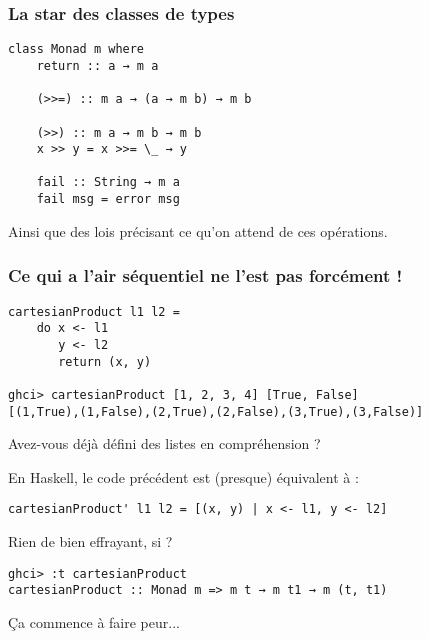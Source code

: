 \documentclass[10pt]{beamer}
\begin{document}
\begin{frame}[fragile]
\frametitle{La star des classes de types}
\begin{verbatim}
class Monad m where
    return :: a → m a

    (>>=) :: m a → (a → m b) → m b

    (>>) :: m a → m b → m b
    x >> y = x >>= \_ → y

    fail :: String → m a
    fail msg = error msg
\end{verbatim}

Ainsi que des lois précisant ce qu'on attend de ces opérations.
\end{frame}



\begin{frame}[fragile]
\frametitle{Ce qui a l'air séquentiel ne l'est pas forcément !}
\begin{verbatim}
cartesianProduct l1 l2 =
    do x <- l1
       y <- l2
       return (x, y)

ghci> cartesianProduct [1, 2, 3, 4] [True, False]
[(1,True),(1,False),(2,True),(2,False),(3,True),(3,False)]
\end{verbatim}

Avez-vous déjà défini des listes en compréhension ?

\pause

En Haskell, le code précédent est (presque) équivalent à :

\begin{verbatim}
cartesianProduct' l1 l2 = [(x, y) | x <- l1, y <- l2]
\end{verbatim}

Rien de bien effrayant, si ?

\pause

\begin{verbatim}
ghci> :t cartesianProduct
cartesianProduct :: Monad m => m t → m t1 → m (t, t1)
\end{verbatim}

Ça commence à faire peur...

\end{frame}
\end{document}
